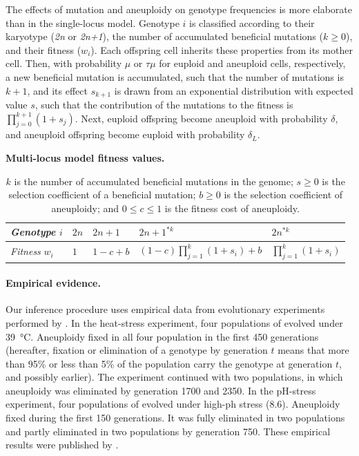 \documentclass[12pt]{extarticle}
\begin{document}
The effects of mutation and aneuploidy on genotype frequencies is more elaborate than in the single-locus model.
Genotype $i$ is classified according to their karyotype (\emph{2n} or \emph{2n+1}), the number of accumulated beneficial mutations ($k \ge 0$), and their fitness ($w_i$).
Each offspring cell inherits these properties from its mother cell.
Then, with probability $\mu$ or $\tau \mu$ for euploid and aneuploid cells, respectively, a new beneficial mutation is accumulated, such that the number of mutations is $k+1$, and its effect $s_{k+1}$ is drawn from an exponential distribution with expected value $s$, such that the contribution of the mutations to the fitness is $\prod_{j=0}^{k+1}{(1+s_j)}$.
Next, euploid offspring become aneuploid with probability $\delta$, and aneuploid offspring become euploid with probability $\delta_L$.

\begin{table}[h]
\centering
\caption{\textbf{Multi-locus model fitness values.}}
\begin{tabular}{lllll}
\emph{Genotype} $i$ & $2n$ & $2n+1$ & $2n+1^{*k}$ & $2n^{*k}$ \\
\hline
\emph{Fitness} $w_i$ & $1$ & $1-c+b$ & $(1-c)\prod_{j=1}^k(1+s_i)+b$ & $\prod_{j=1}^k(1+s_i)$               
\end{tabular}
\label{table:multi-locus}
\caption*{
$k$ is the number of accumulated beneficial mutations in the genome;
$s \ge 0$ is the selection coefficient of a beneficial mutation;
$b \ge 0$ is the selection coefficient of aneuploidy; 
and $0 \le c \le 1$ is the fitness cost of aneuploidy.
}
\end{table}

\paragraph{Empirical evidence.}
Our inference procedure uses empirical data from evolutionary experiments performed by \citet{Yona2012}.
In the heat-stress experiment, four populations of \yeast evolved under \SI{39}{\celsius}. Aneuploidy fixed in all four population in the first 450 generations (hereafter, fixation or elimination of a genotype by generation $t$ means that more than 95\% or less than 5\% of the population carry the genotype at generation $t$, and possibly earlier).
The experiment continued with two populations, in which aneuploidy was eliminated by generation 1700 and 2350.
In the pH-stress experiment, four populations of \yeast evolved under high-ph stress (8.6). Aneuploidy fixed during the first 150 generations. It was fully eliminated in two populations and partly eliminated in two populations by generation 750. 
These empirical results were published by \citet{Yona2012}.
\end{document}

